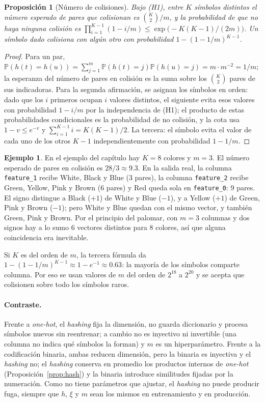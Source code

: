 \documentclass[11pt,a4paper]{article}
\theoremstyle{plain}
\newtheorem{proposicion}[teorema]{Proposición}
\theoremstyle{definition}
\newtheorem{ejemplo}[teorema]{Ejemplo}
\theoremstyle{remark}
\newcommand{\Prob}{\mathbb{P}}
\newcommand{\1}{\mathbf{1}}
\begin{document}
\begin{proposicion}[Número de colisiones]\label{prop:colis}
Bajo (H1), entre $K$ símbolos distintos el número esperado de pares que
colisionan es $\binom K2/m$, y la probabilidad de que no haya ninguna
colisión es $\prod_{i=1}^{K-1}(1-i/m)\le\exp\bigl(-K(K-1)/(2m)\bigr)$.
Un símbolo dado colisiona con algún otro con probabilidad
$1-(1-1/m)^{K-1}$.
\end{proposicion}

\begin{proof}
Para un par, $\Prob(h(t)=h(u))=\sum_{j=1}^m\Prob(h(t)=j)\Prob(h(u)=j)=m\cdot
m^{-2}=1/m$; la esperanza del número de pares en colisión es la suma sobre
los $\binom K2$ pares de sus indicadoras. Para la segunda afirmación, se
asignan los símbolos en orden: dado que los $i$ primeros ocupan $i$
valores distintos, el siguiente evita esos valores con probabilidad
$1-i/m$ por la independencia de (H1); el producto de estas probabilidades
condicionales es la probabilidad de no colisión, y la cota usa $1-v\le
e^{-v}$ y $\sum_{i=1}^{K-1}i=K(K-1)/2$. La tercera: el símbolo evita el
valor de cada uno de los otros $K-1$ independientemente con probabilidad
$1-1/m$.
\end{proof}

\begin{ejemplo}
En el ejemplo del capítulo hay $K=8$ colores y $m=3$. El número esperado
de pares en colisión es $28/3\approx9.3$. En la salida real, la columna
\texttt{feature\_1} recibe White, Black y Blue (3 pares), la columna
\texttt{feature\_2} recibe Green, Yellow, Pink y Brown (6 pares) y Red
queda sola en \texttt{feature\_0}: 9 pares. El signo distingue a
Black ($+1$) de White y Blue ($-1$), y a Yellow ($+1$) de Green, Pink y
Brown ($-1$); pero White y Blue quedan con el mismo vector, y también
Green, Pink y Brown. Por el principio del palomar, con $m=3$ columnas y
dos signos hay a lo sumo $6$ vectores distintos para $8$ colores, así que
alguna coincidencia era inevitable.
\end{ejemplo}

Si $K$ es del orden de $m$, la tercera fórmula da
$1-(1-1/m)^{K-1}\approx1-e^{-1}\approx0.63$: la mayoría de los símbolos
comparte columna. Por eso se usan valores de $m$ del orden de $2^{18}$ a
$2^{20}$ y se acepta que colisionen sobre todo los símbolos raros.

\paragraph{Contraste.} Frente a \emph{one-hot}, el \emph{hashing} fija la
dimensión, no guarda diccionario y procesa símbolos nuevos sin
reentrenar; a cambio no es inyectivo ni invertible (una columna no indica
qué símbolos la forman) y $m$ es un hiperparámetro. Frente a la
codificación binaria, ambas reducen dimensión, pero la binaria es inyectiva
y el \emph{hashing} no; el \emph{hashing} conserva en promedio los
productos internos de \emph{one-hot} (Proposición~\ref{prop:hash}) y la
binaria introduce similitudes fijadas por la numeración. Como no tiene
parámetros que ajustar, el \emph{hashing} no puede producir fuga, siempre
que $h$, $\xi$ y $m$ sean los mismos en entrenamiento y en producción.
\end{document}
